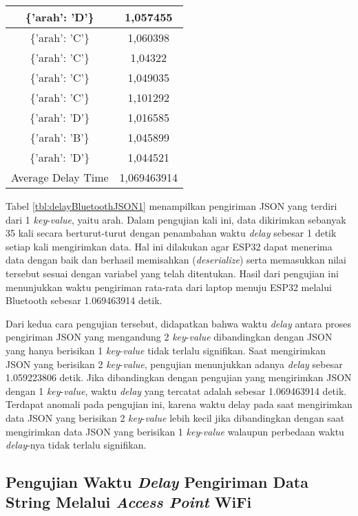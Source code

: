 \begin{table}[!h]
\begin{tabular}{|c|c|}
  \{'arah': 'D'\}    & 1,057455    \\ \hline
  \{'arah': 'C'\}    & 1,060398    \\ \hline
  \{'arah': 'C'\}    & 1,04322     \\ \hline
  \{'arah': 'C'\}    & 1,049035    \\ \hline
  \{'arah': 'C'\}    & 1,101292    \\ \hline
  \{'arah': 'D'\}    & 1,016585    \\ \hline
  \{'arah': 'B'\}    & 1,045899    \\ \hline
  \{'arah': 'D'\}    & 1,044521    \\ \hline
  Average Delay Time & 1,069463914 \\ \hline
  \end{tabular}
\end{table}

Tabel \ref{tbl:delayBluetoothJSON1} menampilkan pengiriman JSON yang terdiri dari 1 \emph{key}-\emph{value}, yaitu arah. Dalam pengujian kali ini, data dikirimkan sebanyak 35 kali secara berturut-turut dengan penambahan waktu \emph{delay} sebesar 1 detik setiap kali mengirimkan data. Hal ini dilakukan agar ESP32 dapat menerima data dengan baik dan berhasil memisahkan (\emph{deserialize}) serta memasukkan nilai tersebut sesuai dengan variabel yang telah ditentukan. Hasil dari pengujian ini menunjukkan waktu pengiriman rata-rata dari laptop menuju ESP32 melalui Bluetooth sebesar 1.069463914 detik.

Dari kedua cara pengujian tersebut, didapatkan bahwa waktu \emph{delay} antara proses pengiriman JSON yang mengandung 2 \emph{key}-\emph{value} dibandingkan dengan JSON yang hanya berisikan 1 \emph{key}-\emph{value} tidak terlalu signifikan. Saat mengirimkan JSON yang berisikan 2 \emph{key}-\emph{value}, pengujian menunjukkan adanya \emph{delay} sebesar 1.059223806 detik. Jika dibandingkan dengan pengujian yang mengirimkan JSON dengan 1 \emph{key}-\emph{value}, waktu \emph{delay} yang tercatat adalah sebesar 1.069463914 detik. Terdapat anomali pada pengujian ini, karena waktu delay pada saat mengirimkan data JSON yang berisikan 2 \emph{key}-\emph{value} lebih kecil jika dibandingkan dengan saat mengirimkan data JSON yang berisikan 1 \emph{key}-\emph{value} walaupun perbedaan waktu \emph{delay}-nya tidak terlalu signifikan.

\subsection{Pengujian Waktu \emph{Delay} Pengiriman Data String Melalui \emph{Access Point} WiFi}

